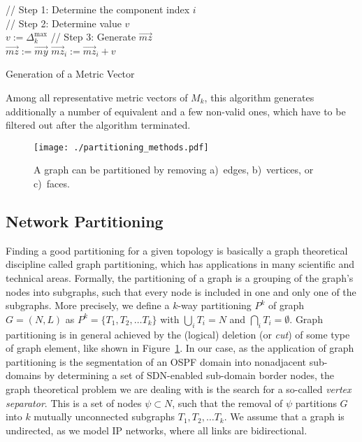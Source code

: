 \documentclass[journal]{IEEEtran}
\begin{document}
\begin{algorithm}[h]\footnotesize
{}
\vspace{2mm}// Step 1: Determine the component index $i$\\
\vspace{2mm}// Step 2: Determine value $v$\\
$v := \Delta_k^\text{max}$\;
\vspace{2mm}// Step 3: Generate $\vec{mz}$\\
$\vec{mz} := \vec{my}$\;
$\vec{mz}_i := \vec{mz}_i + v$\;
\vspace{2mm}\caption{Generation of a Metric Vector}\label{LSA_algo}
\end{algorithm}

Among all representative metric vectors of $M_k$, this algorithm generates additionally a number of equivalent and a few non-valid ones, which have to be filtered out after the algorithm terminated.



\begin{figure}[h] \center
\texttt{[image: ./partitioning\_methods.pdf]}
\caption{A graph can be partitioned by removing a)~edges, b)~vertices, or c)~faces.}
\label{partitioning_methods} \end{figure}

\subsection{Network Partitioning}\label{math_vs}
\par Finding a good partitioning for a given topology is basically a graph theoretical discipline called graph partitioning, which has applications in many scientific and technical areas. Formally, the partitioning of a graph is a grouping of the graph's nodes into subgraphs, such that every node is included in one and only one of the subgraphs. More precisely, we define a $k$-way partitioning $P^k$ of graph $G=(N,L)$ as $P^k=\{T_1,T_2,\ldots T_k\}$ with $\bigcup_i T_i = N$ and $\bigcap_i T_i = \emptyset$. Graph partitioning is in general achieved by the (logical) deletion (or \emph{cut}) of some type of graph element, like shown in Figure~\ref{partitioning_methods}. In our case, as the application of graph partitioning is the segmentation of an OSPF domain into nonadjacent sub-domains by determining a set of SDN-enabled sub-domain border nodes, the graph theoretical problem we are dealing with is the search for a so-called \emph{vertex separator}. This is a set of nodes $\psi\subset N$, such that the removal of $\psi$ partitions $G$ into $k$ mutually unconnected subgraphs ${T_1,T_2,\ldots T_k}$. We assume that a graph is undirected, as we model IP networks, where all links are bidirectional.
\end{document}
